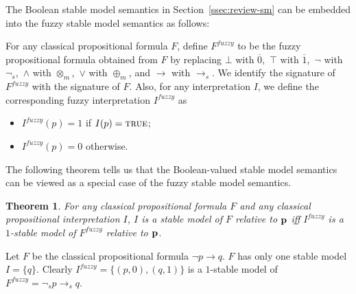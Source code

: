 \documentclass[runningheads]{llncs}
\def\o{\overline}
\def\bi{\begin{itemize}}
\def\ei{\end{itemize}}
\def\mi#1{\mathit{#1}}
\def\rar{\rightarrow}
\def\true{\hbox{\sc true}}
\def\fand{\otimes}
\def\for{\oplus}
\newtheorem{thm}{Theorem}
\begin{document}
The Boolean stable model semantics in Section~\ref{ssec:review-sm} can
be embedded into the fuzzy stable model semantics as follows: 

For any classical propositional formula $F$, define $F^\mi{fuzzy}$ to
be the fuzzy propositional formula obtained from $F$ by replacing $\bot$ with
$\o{0}$,\  $\top$ with $\o{1}$,\  $\neg$ with $\neg_{\!s}$,\ 
$\land$ with $\fand_m$,\ $\lor$ with $\for_m$, and 
$\rar$ with $\rar_s$.   We identify the signature of $F^\mi{fuzzy}$ with
the signature of $F$. Also, for any interpretation $I$, we
define the corresponding fuzzy interpretation $I^\mi{fuzzy}$ as 
\bi
\item  ${I^\mi{fuzzy}}(p) = 1$ if $I(p)=\true$; 
\item  ${I^\mi{fuzzy}}(p) = 0$ otherwise.
\ei

The following theorem tells us that the Boolean-valued stable model
semantics can be viewed as a special case of the fuzzy stable model semantics. 

\begin{thm}\label{thm:cl-fuzzy-sm} 
For any classical propositional formula $F$ and any classical
propositional interpretation $I$, $I$ is a stable model of $F$
relative to ${\bf p}$
iff $I^\mi{fuzzy}$ is a $1$-stable model of $F^\mi{fuzzy}$ relative to
${\bf p}$.
\end{thm}

\begin{example}
Let $F$ be the classical propositional formula $\neg p\rar q$. $F$ has
only one stable model
$I = \{q\}$.
Clearly $I^\mi{fuzzy}=\{(p, 0), (q, 1)\}$ is a $1$-stable
model of $F^\mi{fuzzy}=\neg_{\!s} p\rar_s q$. 
\end{example}
\end{document}
